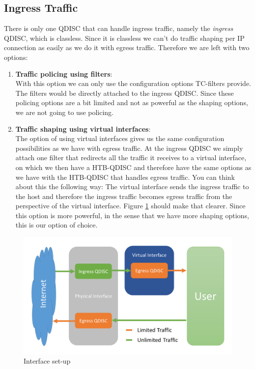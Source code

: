\newpage
\subsection{Ingress Traffic} \label{Ingress Traffic}
There is only one \acs{QDISC} that can handle ingress traffic, namely the \textit{ingress} \acs{QDISC}, which is classless. Since it is classless we can't do traffic shaping per \acs{IP} connection as easily as we do it with egress traffic. Therefore we are left with two options:
\begin{enumerate}
\item \textbf{Traffic policing using filters}:
\\With this option we can only use the configuration options \acs{TC}-filters provide. The filters would be directly attached to the ingress \acs{QDISC}. Since these policing options are a bit limited and not as powerful as the shaping options, we are not going to use policing.
\item \textbf{Traffic shaping using virtual interfaces}:
\\The option of using virtual interfaces gives us the same configuration possibilities as we have with egress traffic. At the ingress \acs{QDISC} we simply attach one filter that redirects all the traffic it receives to a virtual interface, on which we then have a \acs{HTB}-\acs{QDISC} and therefore have the same options as we have with the \acs{HTB}-\acs{QDISC} that handles egress traffic. You can think about this the following way: The virtual interface sends the ingress traffic to the host and therefore the ingress traffic becomes egress traffic from the perspective of the virtual interface. Figure \ref{Interface set-up} should make that clearer. Since this option is more powerful, in the sense that we have more shaping options, this is our option of choice.
\end{enumerate}

\begin{figure}[h]
	\centering
	\includegraphics[width=\textwidth]{img/Interface-Setup.png}
	\caption{Interface set-up}
	\label{Interface set-up}
\end{figure}

